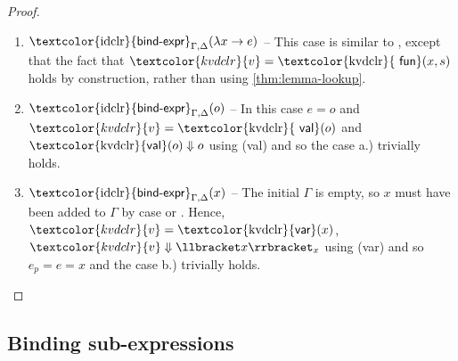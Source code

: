 \documentclass[english,crc,references=cleveref]{programming}
\theoremstyle{plain}
\theoremstyle{definition}
\newcommand{\ident}[1]{\textnormal{\textcolor{idclr}{\sffamily #1}}}
\newcommand{\bndclr}[1]{\textcolor{kvdclr}{#1}}
\newcommand{\bnd}[1]{\textnormal{\textcolor{kvdclr}{\sffamily #1}}}
\newcommand{\rname}[1]{{\sffamily(#1)}}
\begin{document}
\begin{proof}
\begin{enumerate}
\item \label{itm:4} $\ident{bind-expr}_{\Gamma, \Delta}(\lambda x\rightarrow e)$  --
  This case is similar to , except that the fact that $\bndclr{v} = \bnd{fun}(x, s)$
  holds by construction, rather than using \cref{thm:lemma-lookup}.

\item $\ident{bind-expr}_{\Gamma, \Delta}(o)$ -- In this case $e=o$ and $\bndclr{v} = \bnd{val}(o)$
  and $\bnd{val}(o)\Downarrow o$ using \rname{val} and so the case a.) trivially holds.

\item $\ident{bind-expr}_{\Gamma, \Delta}(x)$ -- The initial $\Gamma$ is empty,
  so $x$ must have been added to $\Gamma$ by case  or . Hence,
  $\bndclr{v}=\bnd{var}(x)$, $\bndclr{v}\Downarrow \llbracket x \rrbracket_{x}$ using \rname{var}
  and so $e_p = e = x$ and the case b.) trivially holds.
\end{enumerate}
\end{proof}

\subsection{Binding sub-expressions}
\label{sec:sub-expr}
\end{document}
